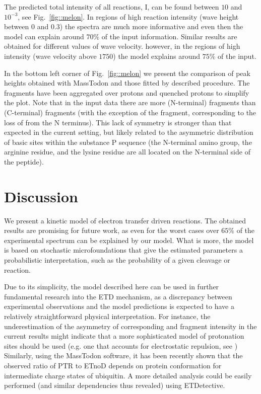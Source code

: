\documentclass{llncs}
\begin{document}
        The predicted total intensity of all reactions, I, can be found between $10$ and $10^{-3}$, see Fig.~\ref{fig::melon}. In regions of high reaction intensity (wave height between $0$ and $0.3$) the spectra are much more informative and even then the model can explain around $70\%$ of the input information. Similar results are obtained for different values of wave velocity. however, in the regions of high intensity (wave velocity above $1750$) the model explains around $75\%$ of the input.

        In the bottom left corner of Fig.~\ref{fig::melon} we present the comparison of peak heights obtained with MassTodon and those fitted by described procedure. The fragments have been aggregated over protons and quenched protons to simplify the plot. Note that in the input data there are more (N-terminal)  fragments than (C-terminal)  fragments (with the exception of the  fragment, corresponding to the loss of  from the N terminus). This lack of symmetry is stronger than that expected in the current setting, but likely related to the asymmetric distribution of basic sites within the substance P sequence (the N-terminal amino group, the arginine residue, and the lysine residue are all located on the N-terminal side of the peptide).

\section{Discussion}
        We present a kinetic model of electron transfer driven reactions. The obtained results are promising for future work, as even for the worst cases over $65\%$ of the experimental spectrum can be explained by our model. What is more, the model is based on stochastic microfoundations that give the estimated parameters a probabilistic interpretation, such as the probability of a given cleavage or reaction.

        Due to its simplicity, the model described here can be used in further fundamental research into the ETD mechanism, as a discrepancy between experimental observations and the model predictions is expected to have a relatively straightforward physical interpretation. For instance, the underestimation of the asymmetry of corresponding  and  fragment intensity in the current results might indicate that a more sophisticated model of protonation sites should be used (e.g. one that accounts for electrostatic repulsion, see \cite{Morrison2016-wc}) Similarly, using the MassTodon software, it has been recently shown \cite{Lermyte2017-zt} that the observed ratio of PTR to ETnoD depends on protein conformation for intermediate charge states of ubiquitin. A more detailed  analysis could be easily performed (and similar dependencies thus revealed) using ETDetective.
\end{document}
